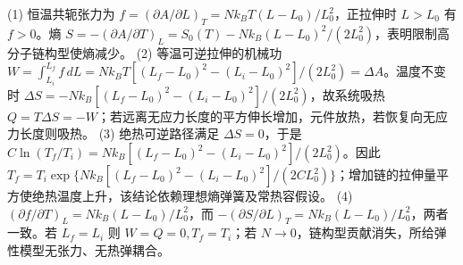 (1) 恒温共轭张力为 \(f=(\partial A/\partial L)_T=Nk_BT(L-L_0)/L_0^2\)，正拉伸时 \(L>L_0\) 有 \(f>0\)。熵 \(S=-(\partial A/\partial T)_L=S_0(T)-Nk_B(L-L_0)^2/(2L_0^2)\)，表明限制高分子链构型使熵减少。
(2) 等温可逆拉伸的机械功 \(W=\int_{L_i}^{L_f}f\,dL=Nk_BT[(L_f-L_0)^2-(L_i-L_0)^2]/(2L_0^2)=\Delta A\)。温度不变时 \(\Delta S=-Nk_B[(L_f-L_0)^2-(L_i-L_0)^2]/(2L_0^2)\)，故系统吸热 \(Q=T\Delta S=-W\)；若远离无应力长度的平方伸长增加，元件放热，若恢复向无应力长度则吸热。
(3) 绝热可逆路径满足 \(\Delta S=0\)，于是 \(C\ln(T_f/T_i)=Nk_B[(L_f-L_0)^2-(L_i-L_0)^2]/(2L_0^2)\)。因此 \(T_f=T_i\exp\{Nk_B[(L_f-L_0)^2-(L_i-L_0)^2]/(2CL_0^2)\}\)；增加链的拉伸量平方使绝热温度上升，该结论依赖理想熵弹簧及常热容假设。
(4) \((\partial f/\partial T)_L=Nk_B(L-L_0)/L_0^2\)，而 \(-(\partial S/\partial L)_T=Nk_B(L-L_0)/L_0^2\)，两者一致。若 \(L_f=L_i\) 则 \(W=Q=0,T_f=T_i\)；若 \(N\to0\)，链构型贡献消失，所给弹性模型无张力、无热弹耦合。
